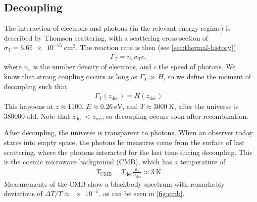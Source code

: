 \subsection{Decoupling}

The interaction of electrons and photons (in the relevant energy regime) is described by Thomson scattering, with a scattering cross-section of $\sigma_T = \SI{6.65e-25}{\cm\squared}$. The reaction rate is then (see \cref{sec:thermal-history})
\begin{align*}
	\Gamma_T = n_e \sigma_T c,
\end{align*}
where $n_e$ is the number density of electrons, and $c$ the speed of photons. We know that strong coupling occurs as long as $\Gamma_T \gg H$, so we define the moment of decoupling such that
\begin{align*}
	\Gamma_T(z_\text{dec}) = H(z_\text{dec})
\end{align*}
This happens at $z \approx 1100$, $E \approx \SI{0.26}{\eV}$, and $T \approx \SI{3000}{\kelvin}$, after the universe is \SI{380000}{\year} old. Note that $z_\text{dec} < z_\text{rec}$, so decoupling occurs soon after recombination.

After decoupling, the universe is transparent to photons. When an observer today stares into empty space, the photons he measures come from the surface of last scattering, where the photons interacted for the last time during decoupling. This is the cosmic microwave background (CMB), which has a temperature of
\begin{align*}
	T_\text{CMB} = T_\text{dec}\frac{a_0}{a_\text{dec}}
	\approx \SI{3}{\kelvin}
\end{align*}
Measurements of the CMB show a blackbody spectrum with remarkably deviations of $\Delta T / T \approx \num{e-5}$, as can be seen in \cref{fig:cmb}.

